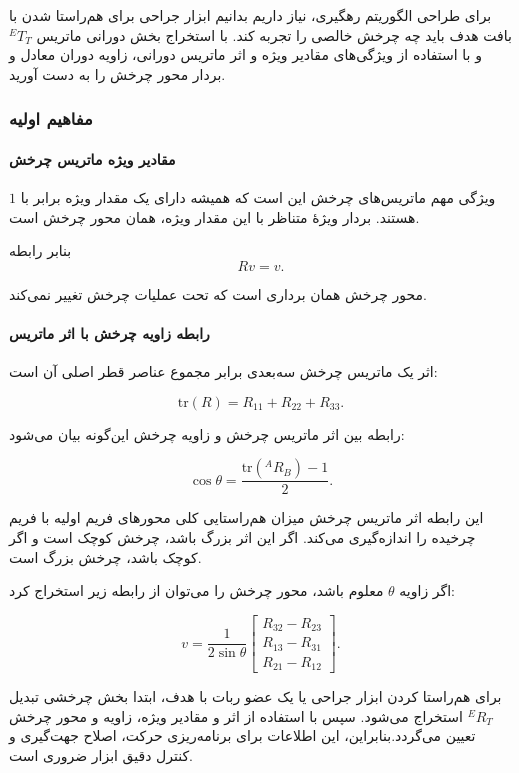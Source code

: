 \documentclass{article}
\begin{document}
برای طراحی الگوریتم رهگیری، نیاز داریم بدانیم ابزار جراحی برای هم‌راستا شدن با بافت هدف باید چه چرخش خالصی را تجربه کند. با استخراج بخش دورانی ماتریس ${}^{E}T_T$ و با استفاده از ویژگی‌های مقادیر ویژه و اثر ماتریس دورانی، زاویه دوران معادل و بردار محور چرخش را به دست آورید.

\subsubsection{مفاهیم اولیه}

\paragraph{مقادیر ویژه ماتریس چرخش}

ویژگی مهم ماتریس‌های چرخش این است که همیشه دارای یک مقدار ویژه  برابر با \(1\) هستند. بردار ویژهٔ  متناظر با این مقدار ویژه، همان محور چرخش است.

بنابر رابطه
\[
R v = v.
\]

محور چرخش همان برداری است که تحت عملیات چرخش تغییر نمی‌کند.

\paragraph{رابطه زاویه چرخش با اثر ماتریس }

اثر یک ماتریس چرخش سه‌بعدی برابر مجموع عناصر قطر اصلی آن است:

\[
\text{tr}(R) = R_{11} + R_{22} + R_{33}.
\]

رابطه بین اثر ماتریس چرخش و زاویه چرخش این‌گونه بیان می‌شود:

\[
\cos\theta = \frac{\text{tr}({}^{A}R_B) - 1}{2}.
\]

این رابطه اثر ماتریس چرخش میزان هم‌راستایی کلی محورهای فریم اولیه با فریم چرخیده را اندازه‌گیری می‌کند. اگر این اثر بزرگ باشد، چرخش کوچک است و اگر کوچک باشد، چرخش بزرگ است.

اگر زاویه \(\theta\) معلوم باشد، محور چرخش را می‌توان از رابطه زیر استخراج کرد:

\[
v = \frac{1}{2\sin\theta}
\begin{bmatrix}
	R_{32}-R_{23}\\
	R_{13}-R_{31}\\
	R_{21}-R_{12}
\end{bmatrix}.
\]

برای هم‌راستا کردن ابزار جراحی یا یک عضو ربات با هدف، ابتدا بخش چرخشی تبدیل \( {}^{E}R_{T} \) استخراج می‌شود. سپس با استفاده از اثر و مقادیر ویژه، زاویه و محور چرخش تعیین می‌گردد.بنابراین، این اطلاعات برای برنامه‌ریزی حرکت، اصلاح جهت‌گیری و کنترل دقیق ابزار ضروری است.
\end{document}
